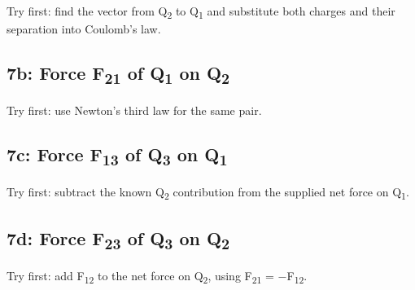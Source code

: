 \documentclass[11pt]{article}
\begin{document}
\begin{keepsection}
\begin{keepsection}
Try first: find the vector from Q\textsubscript{2} to Q\textsubscript{1} and substitute both charges and their separation into Coulomb’s law.

\end{keepsection}

\begin{keepsection}
\subsection{7b: Force F\textsubscript{21} of Q\textsubscript{1} on Q\textsubscript{2}}

Try first: use Newton’s third law for the same pair.

\end{keepsection}

\begin{keepsection}
\subsection{7c: Force F\textsubscript{13} of Q\textsubscript{3} on Q\textsubscript{1}}

Try first: subtract the known Q\textsubscript{2} contribution from the supplied net force on Q\textsubscript{1}.

\end{keepsection}

\begin{keepsection}
\subsection{7d: Force F\textsubscript{23} of Q\textsubscript{3} on Q\textsubscript{2}}

Try first: add F\textsubscript{12} to the net force on Q\textsubscript{2}, using F\textsubscript{21} = \ensuremath{-}F\textsubscript{12}.

\end{keepsection}


\end{keepsection}
\end{document}
